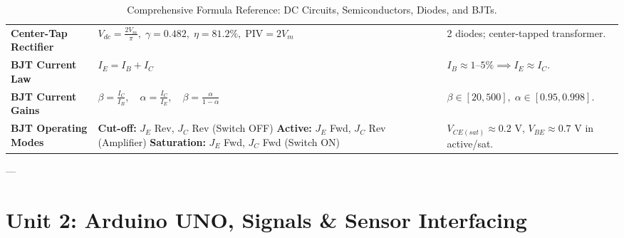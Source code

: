 \begin{table}[htbp]
\begin{tabularx}{\textwidth}{llX}
\textbf{Center-Tap Rectifier} & $V_{dc} = \frac{2V_m}{\pi}, \; \gamma = 0.482, \; \eta = 81.2\%, \; \text{PIV} = 2V_m$ & 2 diodes; center-tapped transformer. \\
\textbf{BJT Current Law} & $I_E = I_B + I_C$ & $I_B \approx 1\text{--}5\% \implies I_E \approx I_C$. \\
\textbf{BJT Current Gains} & $\beta = \frac{I_C}{I_B}, \quad \alpha = \frac{I_C}{I_E}, \quad \beta = \frac{\alpha}{1 - \alpha}$ & $\beta \in [20, 500], \; \alpha \in [0.95, 0.998]$. \\
\textbf{BJT Operating Modes} & \makecell[l]{\textbf{Cut-off:} $J_E$ Rev, $J_C$ Rev (Switch OFF)\\\textbf{Active:} $J_E$ Fwd, $J_C$ Rev (Amplifier)\\\textbf{Saturation:} $J_E$ Fwd, $J_C$ Fwd (Switch ON)} & $V_{CE(sat)} \approx 0.2\text{ V}$, $V_{BE} \approx 0.7\text{ V}$ in active/sat. \\
\bottomrule
\end{tabularx}
\caption{Comprehensive Formula Reference: DC Circuits, Semiconductors, Diodes, and BJTs.}
\label{tab:rev-unit1}
\end{table}

---

\section{Unit 2: Arduino UNO, Signals \& Sensor Interfacing}

